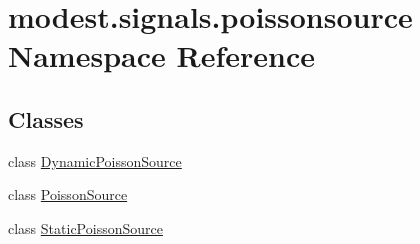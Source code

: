 \hypertarget{namespacemodest_1_1signals_1_1poissonsource}{}\section{modest.\+signals.\+poissonsource Namespace Reference}
\label{namespacemodest_1_1signals_1_1poissonsource}
\subsection*{Classes}
\begin{DoxyCompactItemize}
\item 
class \hyperlink{classmodest_1_1signals_1_1poissonsource_1_1DynamicPoissonSource}{Dynamic\+Poisson\+Source}
\item 
class \hyperlink{classmodest_1_1signals_1_1poissonsource_1_1PoissonSource}{Poisson\+Source}
\item 
class \hyperlink{classmodest_1_1signals_1_1poissonsource_1_1StaticPoissonSource}{Static\+Poisson\+Source}
\end{DoxyCompactItemize}
